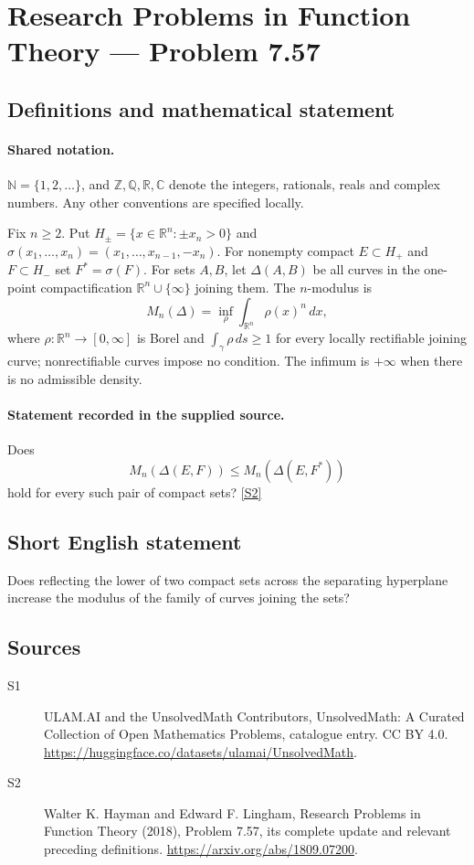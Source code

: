 \documentclass[11pt]{article}
\newcommand{\sref}[2]{\hyperlink{source:#1:#2}{[S#2]}}
\begin{document}
\section{Research Problems in Function Theory — Problem 7.57}\label{statement}

\subsection{Definitions and mathematical statement}

\paragraph{Shared notation.}$\mathbb N=\{1,2,\ldots\}$, and $\mathbb Z,\mathbb Q,\mathbb R,\mathbb C$ denote the integers, rationals, reals and complex numbers. Any other conventions are specified locally.


Fix $n\ge2$. Put $H_\pm=\{x\in\mathbb R^n:\pm x_n>0\}$ and $\sigma(x_1,\ldots,x_n)=(x_1,\ldots,x_{n-1},-x_n)$. For nonempty compact $E\subset H_+$ and $F\subset H_-$ set $F^*=\sigma(F)$. For sets $A,B$, let $\Delta(A,B)$ be all curves in the one-point compactification $\mathbb R^n\cup\{\infty\}$ joining them. The $n$-modulus is
\[M_n(\Delta)=\inf_\rho\int_{\mathbb R^n}\rho(x)^n\,dx,
\]
where $\rho:\mathbb R^n\to[0,\infty]$ is Borel and $\int_\gamma\rho\,ds\ge1$ for every locally rectifiable joining curve; nonrectifiable curves impose no condition. The infimum is $+\infty$ when there is no admissible density.
\paragraph{Statement recorded in the supplied source.}
Does
\[M_n(\Delta(E,F))\le M_n(\Delta(E,F^*))
\]
hold for every such pair of compact sets? \sref{statement}{2}
\subsection{Short English statement}
Does reflecting the lower of two compact sets across the separating hyperplane increase the modulus of the family of curves joining the sets?
\subsection{Sources}
\begin{description}
\item[\hypertarget{source:statement:1}{S1}] ULAM.AI and the UnsolvedMath Contributors, UnsolvedMath: A Curated Collection of Open Mathematics Problems, catalogue entry. CC BY 4.0. \url{https://huggingface.co/datasets/ulamai/UnsolvedMath}.
\item[\hypertarget{source:statement:2}{S2}] Walter K. Hayman and Edward F. Lingham, Research Problems in Function Theory (2018), Problem 7.57, its complete update and relevant preceding definitions. \url{https://arxiv.org/abs/1809.07200}.
\end{description}
\label{end:statement}
\end{document}
